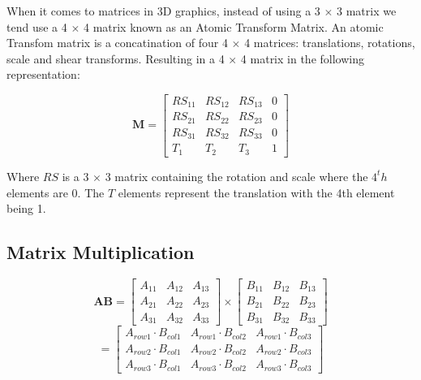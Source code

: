 \begin{flushleft}
When it comes to matrices in 3D graphics, instead of using a 3 $\times$ 3 matrix we tend use a 4 $\times$ 4 matrix known as an Atomic Transform Matrix. An atomic Transfom matrix is a concatination of four 4 $\times$ 4 matrices: translations, rotations, scale and shear transforms. Resulting in a 4 $\times$ 4 matrix in the following representation: 
\end{flushleft}

\begin{equation}
\textbf{M} = \begin{bmatrix}
RS_{11} & RS_{12} & RS_{13} & 0\\
RS_{21} & RS_{22} & RS_{23} & 0\\
RS_{31} & RS_{32} & RS_{33} & 0\\
T_{1} & T_{2} & T_{3} & 1
\end{bmatrix}
\end{equation}

\begin{flushleft}
Where $RS$ is a 3 $\times$ 3 matrix containing the rotation and scale where the $4^th$ elements are 0. The $T$ elements represent the translation with the 4th element being 1. 
\end{flushleft}

\subsection{Matrix Multiplication}

\begin{equation}
\textbf{AB} = \begin{bmatrix}
A_{11} & A_{12} & A_{13}\\
A_{21} & A_{22} & A_{23}\\
A_{31} & A_{32} & A_{33}
\end{bmatrix}
\times
\begin{bmatrix}
B_{11} & B_{12} & B_{13}\\
B_{21} & B_{22} & B_{23}\\
B_{31} & B_{32} & B_{33}
\end{bmatrix}
\end{equation}
\begin{equation}
= \begin{bmatrix}
A_{row1} \cdot B_{col1} & A_{row1} \cdot B_{col2} & A_{row1} \cdot B_{col3}\\
A_{row2} \cdot B_{col1} & A_{row2} \cdot B_{col2} & A_{row2} \cdot B_{col3}\\
A_{row3} \cdot B_{col1} & A_{row3} \cdot B_{col2} & A_{row3} \cdot B_{col3}
\end{bmatrix}
\end{equation}

